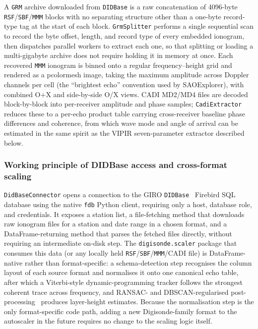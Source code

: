 \documentclass[12pt,a4paper]{article}
\begin{document}
A \texttt{GRM} archive downloaded from \texttt{DIDBase} is a raw
concatenation of 4096-byte \texttt{RSF}/\texttt{SBF}/\texttt{MMM} blocks with
no separating structure other than a one-byte record-type tag at the start
of each block. \texttt{GrmSplitter} performs a single sequential scan to
record the byte offset, length, and record type of every embedded ionogram,
then dispatches parallel workers to extract each one, so that splitting or
loading a multi-gigabyte archive does not require holding it in memory at
once. Each recovered \texttt{MMM} ionogram is binned onto a regular
frequency--height grid and rendered as a pcolormesh image, taking the
maximum amplitude across Doppler channels per cell (the ``brightest echo''
convention used by SAOExplorer), with combined O$+$X and side-by-side O/X
views. CADI MD2/MD4 files are decoded block-by-block into per-receiver
amplitude and phase samples; \texttt{CadiExtractor} reduces these to a
per-echo product table carrying cross-receiver baseline phase differences
and coherence, from which wave mode and angle of arrival can be estimated in
the same spirit as the VIPIR seven-parameter extractor described below.

\subsubsection{Working principle of DIDBase access and cross-format scaling}

\texttt{DidBaseConnector} opens a connection to the GIRO
\texttt{DIDBase}~\cite{ReinischGalkin2011} Firebird SQL database using the
native \texttt{fdb} Python client, requiring only a host, database role, and
credentials. It exposes a station list, a file-fetching method that
downloads raw ionogram files for a station and date range in a chosen
format, and a DataFrame-returning method that parses the fetched files
directly, without requiring an intermediate on-disk step. The
\texttt{digisonde.scaler} package that consumes this data (or any locally
held \texttt{RSF}/\texttt{SBF}/\texttt{MMM}/CADI file) is DataFrame-native
rather than format-specific: a schema-detection step recognises the
column layout of each source format and normalises it onto one canonical
echo table, after which a Viterbi-style dynamic-programming tracker follows
the strongest coherent trace across frequency, and RANSAC- and
DBSCAN-regularised post-processing~\cite{Xu2009} produces layer-height
estimates. Because the normalisation step is the only format-specific code
path, adding a new Digisonde-family format to the autoscaler in the future
requires no change to the scaling logic itself.
\end{document}
